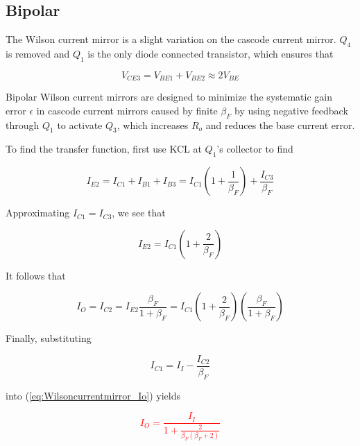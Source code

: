 \subsection{Bipolar}
The Wilson current mirror is a slight variation on the cascode current mirror. $Q_{4}$ is removed and $Q_{1}$ is the only diode connected transistor, which ensures that

\begin{equation}
V_{CE3} = V_{BE1} + V_{BE2} \approx 2V_{BE}
\end{equation}

Bipolar Wilson current mirrors are designed to minimize the systematic gain error $\epsilon$ in cascode current mirrors caused by finite $\beta_{F}$ by using negative feedback through $Q_{1}$ to activate $Q_{3}$, which increases $R_{o}$ and reduces the base current error.
\par To find the transfer function, first use KCL at $Q_{1}$'s collector to find

\begin{equation}
I_{E2} = I_{C1} + I_{B1} + I_{B3} = I_{C1}\left(1+\frac{1}{\beta_{F}}\right) + \frac{I_{C3}}{\beta_{F}}
\end{equation}

Approximating $I_{C1} = I_{C3}$, we see that

\begin{equation}
I_{E2} = I_{C1}\left(1+\frac{2}{\beta_{F}}\right)
\end{equation}

It follows that

\begin{equation}
I_{O} = I_{C2} = I_{E2}\frac{\beta_{F}}{1+\beta_{F}} = I_{C1}\left(1+\frac{2}{\beta_{F}}\right)\left(\frac{\beta_{F}}{1+\beta_{F}}\right)
\label{eq:Wilsoncurrentmirror_Io}
\end{equation}

Finally, substituting

\begin{equation}
I_{C1} = I_{I} - \frac{I_{C2}}{\beta_{F}}
\end{equation}

into (\ref{eq:Wilsoncurrentmirror_Io}) yields

\textcolor{red}{
\begin{equation}
I_{O} = \frac{I_{I}}{1+\frac{2}{\beta_{F} (\beta_{F} + 2)}}
\end{equation}
}

